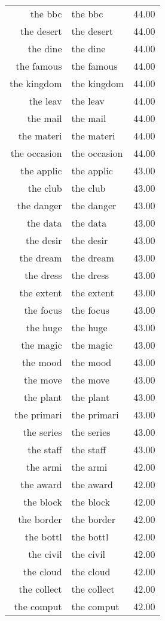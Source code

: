 \begin{table}[ht]
\begin{tabular}{rlr}
  the bbc & the bbc & 44.00 \\ 
  the desert & the desert & 44.00 \\ 
  the dine & the dine & 44.00 \\ 
  the famous & the famous & 44.00 \\ 
  the kingdom & the kingdom & 44.00 \\ 
  the leav & the leav & 44.00 \\ 
  the mail & the mail & 44.00 \\ 
  the materi & the materi & 44.00 \\ 
  the occasion & the occasion & 44.00 \\ 
  the applic & the applic & 43.00 \\ 
  the club & the club & 43.00 \\ 
  the danger & the danger & 43.00 \\ 
  the data & the data & 43.00 \\ 
  the desir & the desir & 43.00 \\ 
  the dream & the dream & 43.00 \\ 
  the dress & the dress & 43.00 \\ 
  the extent & the extent & 43.00 \\ 
  the focus & the focus & 43.00 \\ 
  the huge & the huge & 43.00 \\ 
  the magic & the magic & 43.00 \\ 
  the mood & the mood & 43.00 \\ 
  the move & the move & 43.00 \\ 
  the plant & the plant & 43.00 \\ 
  the primari & the primari & 43.00 \\ 
  the series & the series & 43.00 \\ 
  the staff & the staff & 43.00 \\ 
  the armi & the armi & 42.00 \\ 
  the award & the award & 42.00 \\ 
  the block & the block & 42.00 \\ 
  the border & the border & 42.00 \\ 
  the bottl & the bottl & 42.00 \\ 
  the civil & the civil & 42.00 \\ 
  the cloud & the cloud & 42.00 \\ 
  the collect & the collect & 42.00 \\ 
  the comput & the comput & 42.00 \\ 

\end{tabular}
\end{table}
